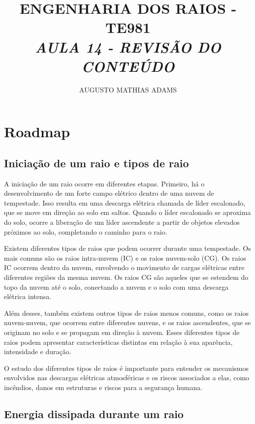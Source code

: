 \documentclass[a4paper, 12pt, onecolumn,singlespacing]{article}
\title{\normalsize{ENGENHARIA DOS RAIOS - TE981}\\ \huge{\textbf\textit{{AULA 14 - REVISÃO DO CONTEÚDO}}\\}}
\author{\small{AUGUSTO MATHIAS ADAMS}}
\begin{document}
	
	\maketitle
	
	\section{Roadmap}
	
	\subsection{Iniciação de um raio e tipos de raio}
	
	A iniciação de um raio ocorre em diferentes etapas. Primeiro, há o desenvolvimento de um forte campo elétrico dentro de uma nuvem de tempestade. Isso resulta em uma descarga elétrica chamada de líder escalonado, que se move em direção ao solo em saltos. Quando o líder escalonado se aproxima do solo, ocorre a liberação de um líder ascendente a partir de objetos elevados próximos ao solo, completando o caminho para o raio.
	
	Existem diferentes tipos de raios que podem ocorrer durante uma tempestade. Os mais comuns são os raios intra-nuvem (IC) e os raios nuvem-solo (CG). Os raios IC ocorrem dentro da nuvem, envolvendo o movimento de cargas elétricas entre diferentes regiões da mesma nuvem. Os raios CG são aqueles que se estendem do topo da nuvem até o solo, conectando a nuvem e o solo com uma descarga elétrica intensa.
	
	Além desses, também existem outros tipos de raios menos comuns, como os raios nuvem-nuvem, que ocorrem entre diferentes nuvens, e os raios ascendentes, que se originam no solo e se propagam em direção à nuvem. Esses diferentes tipos de raios podem apresentar características distintas em relação à sua aparência, intensidade e duração.
	
	O estudo dos diferentes tipos de raios é importante para entender os mecanismos envolvidos nas descargas elétricas atmosféricas e os riscos associados a elas, como incêndios, danos em estruturas e riscos para a segurança humana.
	
	\subsection{Energia dissipada durante um raio}
	
\end{document}
